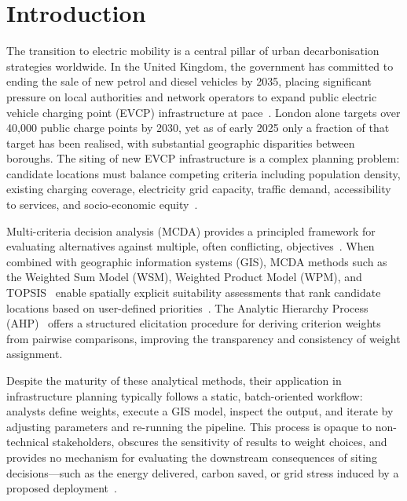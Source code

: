 
\section{Introduction}
\label{sec:introduction}

The transition to electric mobility is a central pillar of urban decarbonisation strategies worldwide. In the United Kingdom, the government has committed to ending the sale of new petrol and diesel vehicles by 2035, placing significant pressure on local authorities and network operators to expand public electric vehicle charging point (EVCP) infrastructure at pace~\cite{tfl2025evstrategy}. London alone targets over 40,000 public charge points by 2030, yet as of early 2025 only a fraction of that target has been realised, with substantial geographic disparities between boroughs. The siting of new EVCP infrastructure is a complex planning problem: candidate locations must balance competing criteria including population density, existing charging coverage, electricity grid capacity, traffic demand, accessibility to services, and socio-economic equity~\cite{banegas2023systematic,kaya2020evcs}.

Multi-criteria decision analysis (MCDA) provides a principled framework for evaluating alternatives against multiple, often conflicting, objectives~\cite{malczewski2015gismcda}. When combined with geographic information systems (GIS), MCDA methods such as the Weighted Sum Model (WSM), Weighted Product Model (WPM), and TOPSIS~\cite{hwang1981topsis} enable spatially explicit suitability assessments that rank candidate locations based on user-defined priorities~\cite{malczewski1999gis}. The Analytic Hierarchy Process (AHP)~\cite{saaty1980ahp} offers a structured elicitation procedure for deriving criterion weights from pairwise comparisons, improving the transparency and consistency of weight assignment.

Despite the maturity of these analytical methods, their application in infrastructure planning typically follows a static, batch-oriented workflow: analysts define weights, execute a GIS model, inspect the output, and iterate by adjusting parameters and re-running the pipeline. This process is opaque to non-technical stakeholders, obscures the sensitivity of results to weight choices, and provides no mechanism for evaluating the downstream consequences of siting decisions---such as the energy delivered, carbon saved, or grid stress induced by a proposed deployment~\cite{andrienko2007geovisual,jankowski2001gis}.

